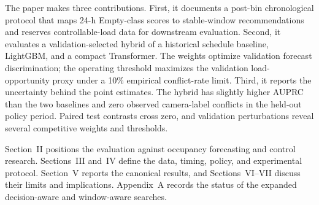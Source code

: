The paper makes three contributions. First, it documents a post-bin chronological protocol that maps 24-h Empty-class scores to stable-window recommendations and reserves controllable-load data for downstream evaluation. Second, it evaluates a validation-selected hybrid of a historical schedule baseline, LightGBM, and a compact Transformer. The weights optimize validation forecast discrimination; the operating threshold maximizes the validation load-opportunity proxy under a 10\% empirical conflict-rate limit. Third, it reports the uncertainty behind the point estimates. The hybrid has slightly higher AUPRC than the two baselines and zero observed camera-label conflicts in the held-out policy period. Paired test contrasts cross zero, and validation perturbations reveal several competitive weights and thresholds.

Section~II positions the evaluation against occupancy forecasting and control research. Sections~III and~IV define the data, timing, policy, and experimental protocol. Section~V reports the canonical results, and Sections~VI--VII discuss their limits and implications. Appendix~A records the status of the expanded decision-aware and window-aware searches.
